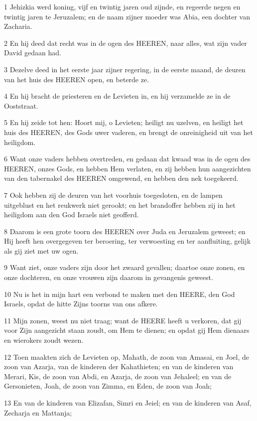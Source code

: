 \par 1 Jehizkia werd koning, vijf en twintig jaren oud zijnde, en regeerde negen en twintig jaren te Jeruzalem; en de naam zijner moeder was Abia, een dochter van Zacharia.
\par 2 En hij deed dat recht was in de ogen des HEEREN, naar alles, wat zijn vader David gedaan had.
\par 3 Dezelve deed in het eerste jaar zijner regering, in de eerste maand, de deuren van het huis des HEEREN open, en beterde ze.
\par 4 En hij bracht de priesteren en de Levieten in, en hij verzamelde ze in de Ooststraat.
\par 5 En hij zeide tot hen: Hoort mij, o Levieten; heiligt nu uzelven, en heiligt het huis des HEEREN, des Gods uwer vaderen, en brengt de onreinigheid uit van het heiligdom.
\par 6 Want onze vaders hebben overtreden, en gedaan dat kwaad was in de ogen des HEEREN, onzes Gods, en hebben Hem verlaten, en zij hebben hun aangezichten van den tabernakel des HEEREN omgewend, en hebben den nek toegekeerd.
\par 7 Ook hebben zij de deuren van het voorhuis toegesloten, en de lampen uitgeblust en het reukwerk niet gerookt; en het brandoffer hebben zij in het heiligdom aan den God Israels niet geofferd.
\par 8 Daarom is een grote toorn des HEEREN over Juda en Jeruzalem geweest; en Hij heeft hen overgegeven ter beroering, ter verwoesting en ter aanfluiting, gelijk als gij ziet met uw ogen.
\par 9 Want ziet, onze vaders zijn door het zwaard gevallen; daartoe onze zonen, en onze dochteren, en onze vrouwen zijn daarom in gevangenis geweest.
\par 10 Nu is het in mijn hart een verbond te maken met den HEERE, den God Israels, opdat de hitte Zijns toorns van ons afkere.
\par 11 Mijn zonen, weest nu niet traag; want de HEERE heeft u verkoren, dat gij voor Zijn aangezicht staan zoudt, om Hem te dienen; en opdat gij Hem dienaars en wierokers zoudt wezen.
\par 12 Toen maakten zich de Levieten op, Mahath, de zoon van Amasai, en Joel, de zoon van Azarja, van de kinderen der Kahathieten; en van de kinderen van Merari, Kis, de zoon van Abdi, en Azarja, de zoon van Jehaleel; en van de Gersonieten, Joah, de zoon van Zimma, en Eden, de zoon van Joah;
\par 13 En van de kinderen van Elizafan, Simri en Jeiel; en van de kinderen van Asaf, Zecharja en Mattanja;
